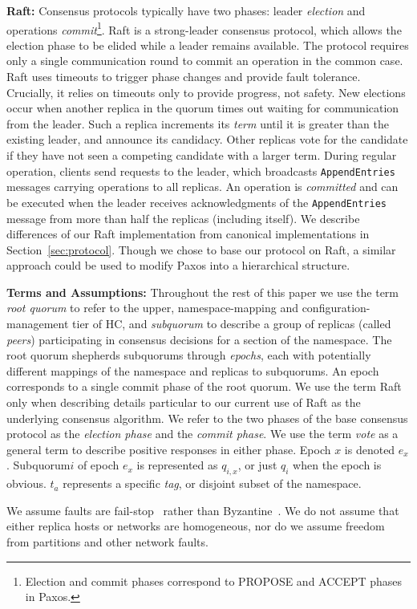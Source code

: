 \documentclass[letterpaper,10pt,twocolumn]{article}
\newcommand{\sub}{subquorum\xspace}
\newcommand{\Sub}{Subquorum\xspace}
\newcommand{\subs}{subquorums\xspace}
\newcommand{\roo}{root quorum\xspace}
\newcommand{\para}[1]{\vspace{.04in}\noindent\textbf{#1}}
\begin{document}
\para{Raft:}
Consensus protocols typically have two phases: leader
\emph{election} and operations \emph{commit}\footnote{Election and commit
  phases correspond to PROPOSE and ACCEPT phases in Paxos.}.
Raft is a strong-leader consensus protocol, which allows the election
phase to be elided while a leader remains available.
The protocol requires only a single communication round to commit an
operation in the common case.
Raft uses timeouts to trigger phase changes and provide fault
tolerance.
Crucially, it relies on timeouts only to provide progress, not safety.
New elections occur when another replica in the quorum
times out waiting for communication from the leader.
Such a replica increments its \emph{term} until it is greater than the
existing leader, and announce its candidacy.
Other replicas vote for the candidate if they have not seen a competing
candidate with a larger term.
During regular operation, clients send requests to the leader, which
broadcasts \texttt{AppendEntries} messages carrying
operations to all replicas.
An operation is \emph{committed} and can be executed when the leader
receives acknowledgments of the \texttt{AppendEntries} message from
more than half the replicas (including itself).
We describe differences of our Raft implementation from canonical
implementations in Section~\ref{sec:protocol}.
Though we chose to base our protocol on Raft, a similar approach could be used
to modify Paxos into a hierarchical structure.

\para{Terms and Assumptions:} Throughout the rest of this paper we use the
term \emph{\roo} to refer to the upper, namespace-mapping and
configuration-management tier of HC, and \emph{\sub} to describe a group of
replicas (called \emph{peers}) participating in consensus decisions for a
section of the namespace.
The \roo shepherds \subs through \emph{epochs}, each with potentially
different mappings of the namespace and replicas to \subs.
An epoch corresponds to a single commit phase of the \roo.
We use the term Raft only when describing details particular to our current
use of Raft as the underlying consensus algorithm.
We refer to the two phases of the base consensus protocol as the
\emph{election phase} and the \emph{commit phase}.
We use the term \emph{vote} as a general term to describe positive responses
in either phase.
Epoch $x$ is denoted $e_x$.
\Sub $i$ of epoch $e_x$ is represented as $q_{i,x}$, or just $q_i$ when the
epoch is obvious.
$t_a$ represents a specific \emph{tag}, or disjoint subset of the namespace.

We assume faults are fail-stop~\cite{fail-stop} rather than Byzantine~\cite{lamport1982byzantine}.
We do not assume that either replica hosts or networks are homogeneous, nor do we assume
freedom from partitions and other network faults.
\end{document}
